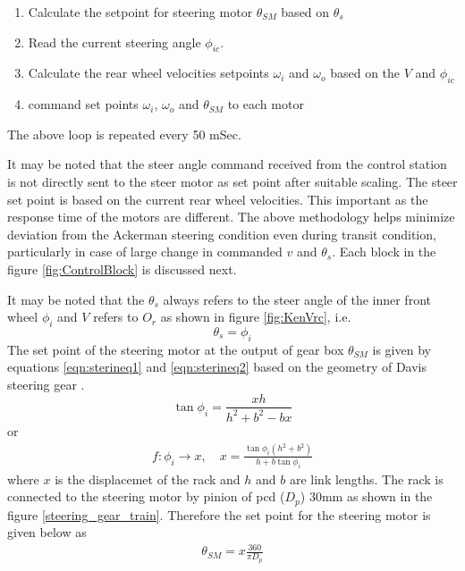 \begin{enumerate}
	\item Calculate the setpoint for steering motor $\theta_{SM} $ based on $\theta_s$
	\item Read the current steering  angle $\phi_{ic}$.
	\item Calculate the rear wheel velocities setpoints $\omega_{i}$ and $\omega_{o}$ based on the $V$ and $\phi_{ic}$

	
	\item command  set points $\omega_{i}$, $\omega_{o}$ and $\theta_{SM} $ to each motor 
\end{enumerate}
The above loop is repeated every 50 mSec.

It may be noted that the steer angle command received from the control station is not directly sent to the steer motor as set point after suitable scaling. The steer set point is based on the current rear wheel velocities. This important as the response time of the  motors are different. The above methodology helps  minimize deviation  from the Ackerman  steering condition even during transit condition, particularly in case of large change in commanded $v$ and $\theta_s$. 
Each block in the figure \ref{fig:ControlBlock} is discussed next. 

 It may be noted that the $\theta_s$ always refers to the steer angle of the inner front wheel $\phi_i$  and $V$ refers to $O_r$ as shown in figure \ref{fig:KenVrc}, i.e.
 \begin{equation}
	 \theta_s =\phi_i
 \end{equation}
 The set point of the steering motor at the output of  gear box $\theta_{SM}$ is given by equations \ref{eqn:sterineq1} and \ref{eqn:sterineq2}  based on the geometry of Davis steering gear \cite{TOMBook}.
\begin{equation*}
 \tan\phi_i=\frac{xh}{h^2+b^2-bx}
\end{equation*}
or
\begin{eqnarray}
f:\phi_i\rightarrow x, \quad x=\frac{\tan\phi_i (h^2+b^2)}{h+b \tan\phi_i }
\label{eqn:sterineq1}
\end{eqnarray}
where $x$ is the displacemet of the rack and $h$ and $b$ are link lengths. The rack is connected to the steering motor by pinion of pcd ($D_p$) 30mm as shown in the figure \ref{steering_gear_train}. Therefore the set point for the steering motor is given below as
\begin{eqnarray}
\theta_{SM}= x \frac{360}{\pi D_p}
\label{eqn:sterineq2}
\end{eqnarray}
 
